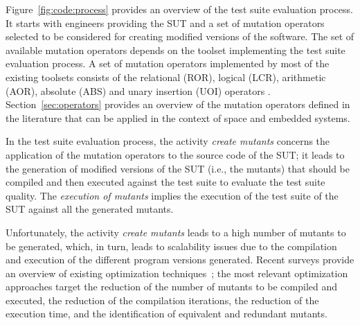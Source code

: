 Figure~\ref{fig:code:process} provides an overview of the test suite evaluation process.
It starts with engineers providing the SUT and a set of mutation operators selected to be considered for creating modified versions of the software. 
The set of available mutation operators depends on the toolset implementing the test suite evaluation process. 
A set of mutation operators implemented by most of the existing toolsets consists of the relational (ROR), logical (LCR), arithmetic (AOR), absolute (ABS) and unary insertion (UOI) operators \cite{rothermel1996experimental}. 
Section~\ref{sec:operators} provides an overview of the mutation operators defined in the literature that can be applied in the context of space and embedded systems.

In the test suite evaluation process, the activity \emph{create mutants} concerns the application of the mutation operators to the source code of the SUT; it leads to the generation of modified versions of the SUT (i.e., the mutants) that should be compiled and then executed against the test suite to evaluate the test suite quality. 
The \emph{execution of mutants} implies the execution of the test suite of the SUT against all the generated mutants. 

Unfortunately, the activity \emph{create mutants} leads to a high number of mutants to be generated, which, in turn, leads to scalability issues due to the compilation and execution of the different program versions generated. Recent surveys provide an overview of existing optimization techniques~\cite{ferrari2018systematic};
the most relevant optimization approaches target the reduction of the number of mutants to be compiled and executed, 
the reduction of the compilation iterations, the reduction of the execution time, and the identification of equivalent and redundant mutants.

